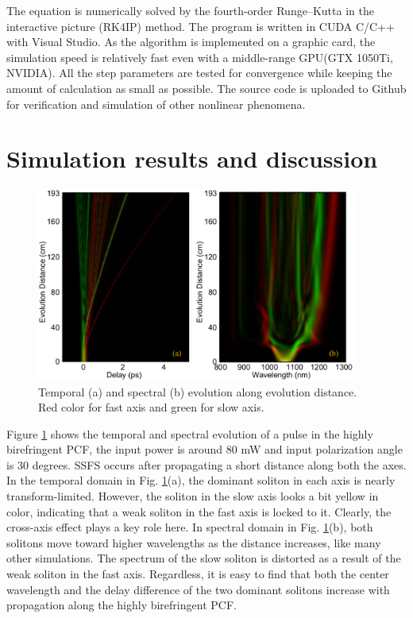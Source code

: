 \documentclass{osa-article}
\begin{document}
The equation is numerically solved by the fourth-order Runge--Kutta in the interactive picture (RK4IP)\cite{Hult2007} method. The program is written in CUDA C/C++ with Visual Studio. As the algorithm is implemented on a graphic card, the simulation speed is relatively fast even with a middle-range GPU(GTX 1050Ti, NVIDIA). All the step parameters are tested for convergence while keeping the amount of calculation as small as possible. The source code is uploaded to Github for verification and simulation of other nonlinear phenomena.


\section{Simulation results and discussion}

\begin{figure}[htbp]
    \centering%
    \includegraphics[width=300pt]{fig_propagation.pdf}
    \caption{Temporal (a) and spectral (b) evolution along evolution distance. Red color for fast axis and green for slow axis.}
    \label{fig_propagation}\vspace*{-6pt}
\end{figure}
 
Figure \ref{fig_propagation} shows the temporal and spectral evolution of a pulse in the highly birefringent PCF, the input power is around 80 mW and input polarization angle is 30 degrees. SSFS occurs after propagating a short distance along both the axes. In the temporal domain in Fig. \ref{fig_propagation}(a), the dominant soliton in each axis is nearly transform-limited. However, the soliton in the slow axis looks a bit yellow in color, indicating that a weak soliton in the fast axis is locked to it. Clearly, the cross-axis effect plays a key role here. In spectral domain in Fig. \ref{fig_propagation}(b), both solitons move toward higher wavelengths as the distance increases, like many other simulations\cite{dudley_supercontinuum_2006}. The spectrum of the slow soliton is distorted as a result of the weak soliton in the fast axis. Regardless, it is easy to find that both the center wavelength and the delay difference of the two dominant solitons increase with propagation along the highly birefringent PCF.
\end{document}

